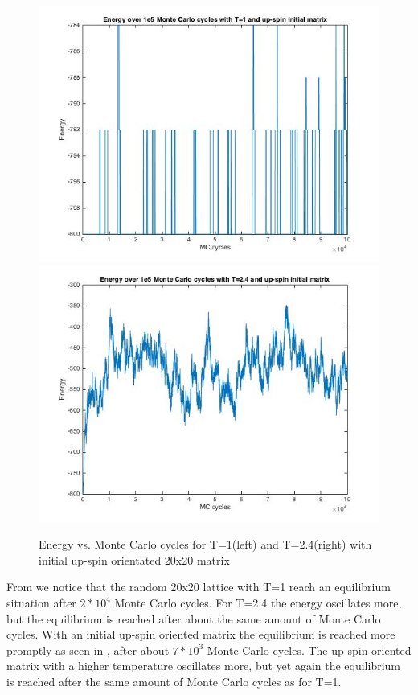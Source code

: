 \documentclass[10pt,a4paper]{article}
\begin{document}
\begin{figure}[H]
\centerline{
\includegraphics[scale=0.4]{energy20_1e5mc_up}
\includegraphics[scale=0.4]{energy20_1e5mc_T24_up}
}
\caption{Energy vs. Monte Carlo cycles for T=1(left) and T=2.4(right) with initial up-spin orientated 20x20 matrix}
\label{fig:energy_20_1e5_up}
\end{figure}

\noindent From  we notice that the random 20x20 lattice with T=1 reach an equilibrium situation after $2*10^4$ Monte Carlo cycles. For T=2.4 the energy oscillates more, but the equilibrium is reached after about the same amount of Monte Carlo cycles. With an initial up-spin oriented matrix the equilibrium is reached more promptly as seen in , after about $7*10^3$ Monte Carlo cycles. The up-spin oriented matrix with a higher temperature oscillates more, but yet again the equilibrium is reached after the same amount of Monte Carlo cycles as for T=1.
\end{document}
